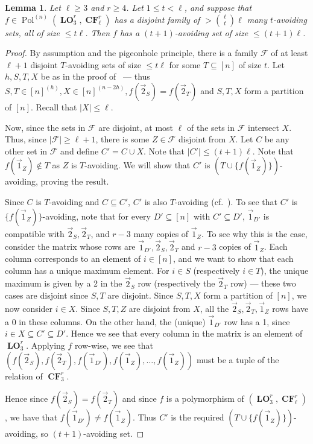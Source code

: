 \documentclass[a4paper,11pt]{article}
\newcommand{\2}{\vec{2}}
\newcommand{\1}{\vec{1}}
\newcommand{\0}{\vec{0}}
\DeclareMathOperator{\Pol}{Pol}
\DeclareMathOperator{\CF}{\mathbf{CF}}
\DeclareMathOperator{\LO}{\mathbf{LO}}
\theoremstyle{plain}
\newtheorem{lemma}[theorem]{Lemma}
\theoremstyle{definition}
\begin{document}
\begin{lemma} \label{lem:boosting}
  Let $  \ell \geq 3$ and $r\geq 4$. Let $1\leq t<\ell$, and suppose that $f\in \Pol^{(n)}(\LO_3^r, \CF_\ell^r)$ has a disjoint family of $> \binom{\ell}{t}\ell$ many $t$-avoiding sets, all of size $\leq t\ell$. Then $f$ has a $(t+1)$-avoiding set of size $\leq (t+1)\ell$.
\end{lemma}
\begin{proof}
By assumption and the pigeonhole principle, there is a family $\mathcal{F}$ of at least $\ell+1$ disjoint $T$-avoiding sets of size $\leq t \ell$ for some $T \subseteq [n]$ of size $t$. Let $h,S,T,X$ be as in the proof of~ --- thus $S, T \in [n]^{(h)}, X \in [n]^{(n - 2h)}, f(\2_S) = f(\2_T)$ and $S, T, X$ form a partition of $[n]$. Recall that $|X| \leq \ell$.

  Now, since the sets in $\mathcal{F}$ are disjoint, at most $\ell$ of the sets in
  $\mathcal{F}$ intersect $X$. Thus, since $|\mathcal{F}| \geq \ell+1$, there is
  some $Z\in \mathcal{F}$ disjoint from $X$. Let $C$ be any other set in
  $\mathcal{F}$ and define $C' = C \cup X$. Note that $|C'| \leq (t+1)\ell$.
  Note that $f( \1_Z) \notin T$ as $Z$ is $T$-avoiding. We will show that $C'$
  is $(T\cup \{f(\1_Z)\})$-avoiding, proving the result.

Since $C$ is $T$-avoiding and $C\subseteq C'$, $C'$ is also $T$-avoiding
  (cf.~). To see that $C'$ is
  $\{f(\1_Z)\}$-avoiding, note that for every $D' \subseteq [n]$ with $C'
  \subseteq D'$, $\1_{D'}$ is compatible with $\2_S, \2_T$, and $r-3$ many
  copies of  $\1_Z$. To see why this is the case, consider the matrix whose rows
  are $\1_{D'}, \2_S, \2_T$ and $r - 3$ copies of $\1_Z$. Each column
  corresponds to an element of $i \in [n]$, and we want to show that each column
  has a unique maximum element. For $i \in S$ (respectively $i \in T$), the
  unique maximum is given by a 2 in the $\2_S$ row (respectively the $\2_T$ row)
  --- these two cases are disjoint since $S, T$ are disjoint. Since $S, T, X$
  form a partition of $[n]$, we now consider $i \in X$. Since $S, T, Z$ are
  disjoint from $X$, all the $\2_S, \2_T, \1_Z$ rows have a 0 in these columns.
  On the other hand, the (unique) $\1_{D'}$ row has a 1, since $i \in X
  \subseteq C' \subseteq D'$. Hence we see that every column in the matrix is an
  element of $\LO_3^r$. Applying $f$ row-wise, we see that $(f(\2_S), f(\2_T),
  f(\1_{D'}), f(\1_Z), \ldots, f(\1_Z))$ must be a tuple of the relation of $\CF_3^r$.

  Hence since $f(\2_S) = f(\2_T)$ and since $f$ is a polymorphism of
  $(\LO_3^r,\CF_\ell^r)$, we have that $f(\1_{D'}) \neq f(\1_Z)$. Thus $C'$ is
  the required $(T\cup \{f(\1_Z)\})$-avoiding, so $(t + 1)$-avoiding set.
\end{proof}
\end{document}
